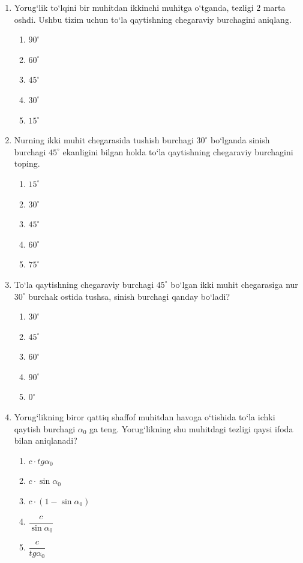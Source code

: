 \begin{enumerate}
\item Yorug‘lik to‘lqini bir muhitdan ikkinchi muhitga o‘tganda, tezligi $2$ marta oshdi. Ushbu tizim uchun to‘la qaytishning chegaraviy burchagini aniqlang.
\begin{enumerate}[label=\Alph*)]
\item $90^\circ$
\item $60^\circ$
\item $45^\circ$
\item $30^\circ$
\item $15^\circ$
\end{enumerate}

\item Nurning ikki muhit chegarasida tushish burchagi $30^\circ$ bo‘lganda sinish burchagi $45^\circ$ ekanligini bilgan holda to‘la qaytishning chegaraviy burchagini toping.
\begin{enumerate}[label=\Alph*)]
\item $15^\circ$
\item $30^\circ$
\item $45^\circ$
\item $60^\circ$
\item $75^\circ$
\end{enumerate}

\item To‘la qaytishning chegaraviy burchagi $45^\circ$ bo‘lgan ikki muhit chegarasiga nur $30^\circ$ burchak ostida tushsa, sinish burchagi qanday bo‘ladi?
\begin{enumerate}[label=\Alph*)]
\item $30^\circ$
\item $45^\circ$
\item $60^\circ$
\item $90^\circ$
\item $0^\circ$
\end{enumerate}

\item Yorug‘likning biror qattiq shaffof muhitdan havoga o‘tishida to‘la ichki qaytish burchagi $\alpha_0$ ga teng. Yorug‘likning shu muhitdagi tezligi qaysi ifoda bilan aniqlanadi?
\begin{enumerate}[label=\Alph*)]
\item $c\cdot tg\alpha_0$
\item $c\cdot \sin\alpha_0$
\item $c\cdot (1-\sin\alpha_0)$
\item $\dfrac{c}{\sin\alpha_0}$
\item $\dfrac{c}{tg\alpha_0}$
\end{enumerate}


\end{enumerate}
